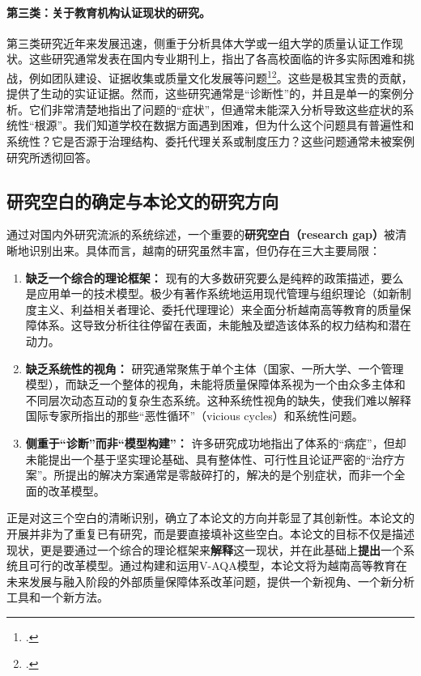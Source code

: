 \paragraph{第三类：关于教育机构认证现状的研究。}
第三类研究近年来发展迅速，侧重于分析具体大学或一组大学的质量认证工作现状。这些研究通常发表在国内专业期刊上，指出了各高校面临的许多实际困难和挑战，例如团队建设、证据收集或质量文化发展等问题\footcite{VJE_Challenges2023}\footcite{ExpertPerspectivesVN}。这些是极其宝贵的贡献，提供了生动的实证证据。然而，这些研究通常是“诊断性”的，并且是单一的案例分析。它们非常清楚地指出了问题的“症状”，但通常未能深入分析导致这些症状的系统性“根源”。我们知道学校在数据方面遇到困难，但为什么这个问题具有普遍性和系统性？它是否源于治理结构、委托代理关系或制度压力？这些问题通常未被案例研究所透彻回答。

\subsection{研究空白的确定与本论文的研究方向}
\label{subsec:xac_dinh_khoang_trong}

通过对国内外研究流派的系统综述，一个重要的\textbf{研究空白（research gap）}被清晰地识别出来。具体而言，越南的研究虽然丰富，但仍存在三大主要局限：
\begin{enumerate}
    \item \textbf{缺乏一个综合的理论框架：} 现有的大多数研究要么是纯粹的政策描述，要么是应用单一的技术模型。极少有著作系统地运用现代管理与组织理论（如新制度主义、利益相关者理论、委托代理理论）来全面分析越南高等教育的质量保障体系。这导致分析往往停留在表面，未能触及塑造该体系的权力结构和潜在动力。
    
    \item \textbf{缺乏系统性的视角：} 研究通常聚焦于单个主体（国家、一所大学、一个管理模型），而缺乏一个整体的视角，未能将质量保障体系视为一个由众多主体和不同层次动态互动的复杂生态系统。这种系统性视角的缺失，使我们难以解释国际专家所指出的那些“恶性循环”（vicious cycles）和系统性问题。
    
    \item \textbf{侧重于“诊断”而非“模型构建”：} 许多研究成功地指出了体系的“病症”，但却未能提出一个基于坚实理论基础、具有整体性、可行性且论证严密的“治疗方案”。所提出的解决方案通常是零敲碎打的，解决的是个别症状，而非一个全面的改革模型。
\end{enumerate}

正是对这三个空白的清晰识别，确立了本论文的方向并彰显了其创新性。本论文的开展并非为了重复已有研究，而是要直接填补这些空白。本论文的目标不仅是描述现状，更是要通过一个综合的理论框架来\textbf{解释}这一现状，并在此基础上\textbf{提出}一个系统且可行的改革模型。通过构建和运用V-AQA模型，本论文将为越南高等教育在未来发展与融入阶段的外部质量保障体系改革问题，提供一个新视角、一个新分析工具和一个新方法。







